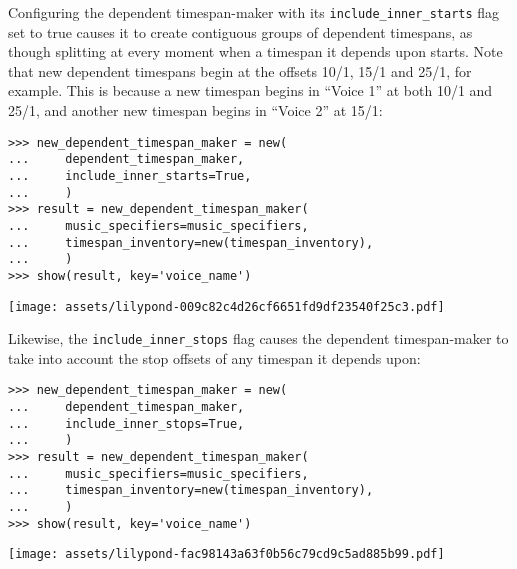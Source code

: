 Configuring the dependent timespan-maker with its
\texttt{include\_inner\_starts} flag set to true causes it to create contiguous
groups of dependent timespans, as though splitting at every moment when a
timespan it depends upon starts. Note that new dependent timespans begin at the
offsets 10/1, 15/1 and 25/1, for example. This is because a new timespan begins
in \enquote{Voice 1} at both 10/1 and 25/1, and another new timespan begins in
\enquote{Voice 2} at 15/1:

\begin{comment}
<abjad>
new_dependent_timespan_maker = new(
    dependent_timespan_maker,
    include_inner_starts=True,
    )
result = new_dependent_timespan_maker(
    music_specifiers=music_specifiers,
    timespan_inventory=new(timespan_inventory),
    )
show(result, key='voice_name')
</abjad>
\end{comment}

\begin{abjadbookoutput}
\begin{singlespacing}
\vspace{-0.5\baselineskip}
\begin{verbatim}
>>> new_dependent_timespan_maker = new(
...     dependent_timespan_maker,
...     include_inner_starts=True,
...     )
>>> result = new_dependent_timespan_maker(
...     music_specifiers=music_specifiers,
...     timespan_inventory=new(timespan_inventory),
...     )
>>> show(result, key='voice_name')
\end{verbatim}
\noindent\texttt{[image: assets/lilypond-009c82c4d26cf6651fd9df23540f25c3.pdf]}
\end{singlespacing}
\end{abjadbookoutput}

\noindent Likewise, the \texttt{include\_inner\_stops} flag causes the
dependent timespan-maker to take into account the stop offsets of any timespan
it depends upon:

\begin{comment}
<abjad>
new_dependent_timespan_maker = new(
    dependent_timespan_maker,
    include_inner_stops=True,
    )
result = new_dependent_timespan_maker(
    music_specifiers=music_specifiers,
    timespan_inventory=new(timespan_inventory),
    )
show(result, key='voice_name')
</abjad>
\end{comment}

\begin{abjadbookoutput}
\begin{singlespacing}
\vspace{-0.5\baselineskip}
\begin{verbatim}
>>> new_dependent_timespan_maker = new(
...     dependent_timespan_maker,
...     include_inner_stops=True,
...     )
>>> result = new_dependent_timespan_maker(
...     music_specifiers=music_specifiers,
...     timespan_inventory=new(timespan_inventory),
...     )
>>> show(result, key='voice_name')
\end{verbatim}
\noindent\texttt{[image: assets/lilypond-fac98143a63f0b56c79cd9c5ad885b99.pdf]}
\end{singlespacing}
\end{abjadbookoutput}

